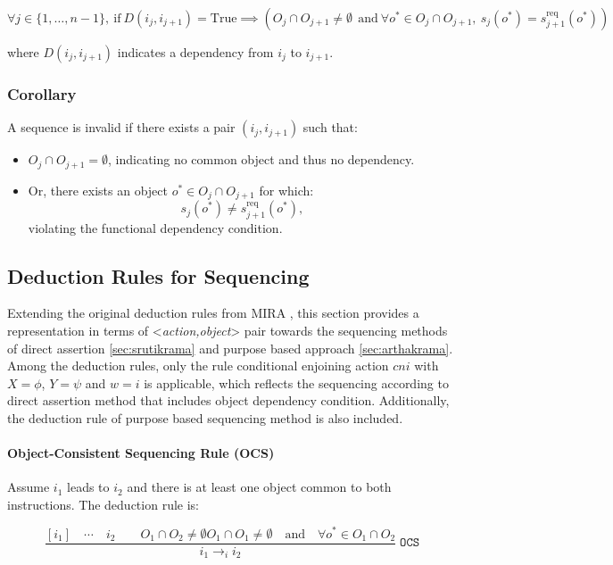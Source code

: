\documentclass[a4paper,11pt]{lmcs}
\begin{document}
\[
\forall j \in \{1, \ldots, n-1\},\
\text{if}\ D(i_j, i_{j+1}) = \text{True}
\implies
\left( O_j \cap O_{j+1} \neq \emptyset\
\ \text{and}\
\forall o^* \in O_j \cap O_{j+1},\ s_j(o^*) = s_{j+1}^{\mathrm{req}}(o^*) \right)
\]

where $D(i_j, i_{j+1})$ indicates a dependency from $i_j$ to $i_{j+1}$.


\subsubsection{Corollary}
A sequence is invalid if there exists a pair \( (i_j, i_{j+1}) \) such that:
\begin{itemize}
  \item \( O_j \cap O_{j+1} = \emptyset \), indicating no common object and thus no dependency.
  \item Or, there exists an object \( o^* \in O_j \cap O_{j+1} \) for which:
    \[
    s_j(o^*) \neq s_{j+1}^{\mathrm{req}}(o^*),
    \]
    violating the functional dependency condition.
\end{itemize}
\subsection{Deduction Rules for Sequencing}

Extending the original deduction rules from MIRA \cite{mira}, this section provides a representation in terms of <\textit{action,object}> pair towards the sequencing methods of direct assertion \ref{sec:srutikrama} and purpose based approach \ref{sec:arthakrama}. Among the deduction rules, only the rule conditional enjoining action $cni$ with $X = \phi$, $Y = \psi$ and $w = i$ is applicable, which reflects the sequencing according to direct assertion method that includes object dependency condition. Additionally, the deduction rule of purpose based sequencing method is also included.


\paragraph{Object-Consistent Sequencing Rule (OCS)}

Assume $i_1$ leads to $i_2$ and there is at least one object common to both instructions. The deduction rule is:

\[
\frac{
    [i_1] \quad \cdots \quad i_2 \qquad O_1 \cap O_2 \neq \emptyset O_1 \cap O_{1} \neq \emptyset \quad \text{and} \quad
\forall o^* \in O_1 \cap O_2
}{
    i_1 \rightarrow_i i_2
} \;\texttt{OCS}
\]
\end{document}
